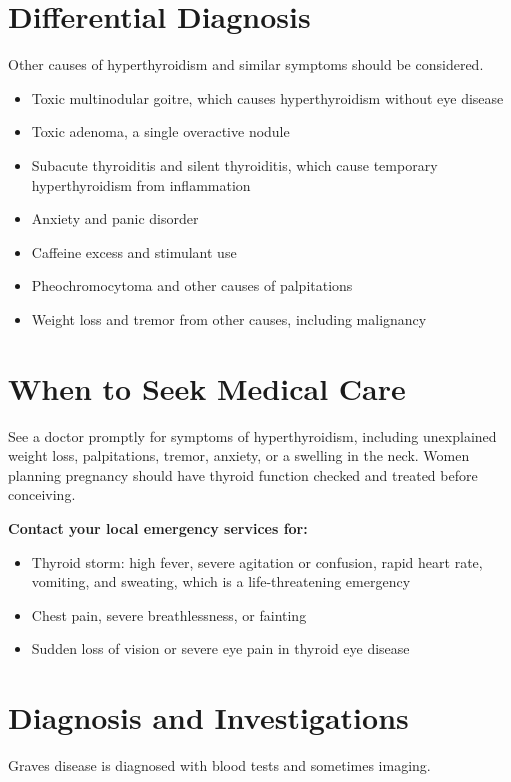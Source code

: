 \section*{Differential Diagnosis}
Other causes of hyperthyroidism and similar symptoms should be considered.

\begin{itemize}
    \item Toxic multinodular goitre, which causes hyperthyroidism without eye disease
    \item Toxic adenoma, a single overactive nodule
    \item Subacute thyroiditis and silent thyroiditis, which cause temporary hyperthyroidism from inflammation
    \item Anxiety and panic disorder
    \item Caffeine excess and stimulant use
    \item Pheochromocytoma and other causes of palpitations
    \item Weight loss and tremor from other causes, including malignancy
\end{itemize}

\section*{When to Seek Medical Care}
See a doctor promptly for symptoms of hyperthyroidism, including unexplained weight loss, palpitations, tremor, anxiety, or a swelling in the neck. Women planning pregnancy should have thyroid function checked and treated before conceiving.

\textbf{Contact your local emergency services for:}
\begin{itemize}
    \item Thyroid storm: high fever, severe agitation or confusion, rapid heart rate, vomiting, and sweating, which is a life-threatening emergency
    \item Chest pain, severe breathlessness, or fainting
    \item Sudden loss of vision or severe eye pain in thyroid eye disease
\end{itemize}

\section*{Diagnosis and Investigations}
Graves disease is diagnosed with blood tests and sometimes imaging.


